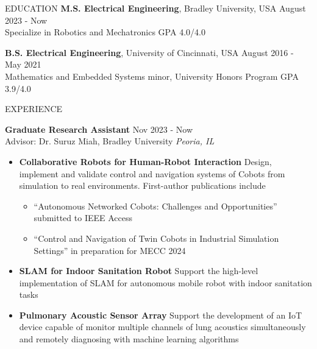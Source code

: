 \documentclass{lib/resume} %
\begin{document}
\begin{rSection}{EDUCATION}
    {\bf M.S. Electrical Engineering}, Bradley University, USA \hfill {August 2023 - Now} \\
    Specialize in Robotics and Mechatronics \hfill GPA 4.0/4.0 \smallskip

    {\bf B.S. Electrical Engineering}, University of Cincinnati, USA \hfill {August 2016 - May 2021}\\
    Mathematics and Embedded Systems minor, University Honors Program \hfill {GPA 3.9/4.0}
\end{rSection}

\begin{rSection}{EXPERIENCE}

    \textbf{Graduate Research Assistant} \hfill Nov 2023 - Now \\
    Advisor: Dr. Suruz Miah, Bradley University \hfill \textit{Peoria, IL}
    \begin{itemize}
        \itemsep -4pt {}
        \item \textbf{Collaborative Robots for Human-Robot Interaction} Design,
        implement and validate control and navigation systems of Cobots from
        simulation to real environments. First-author publications include
        \begin{itemize}[label=$\circ$]
            \vspace{-3pt}
            \item ``Autonomous Networked Cobots: Challenges and Opportunities'' submitted to IEEE Access
            \vspace{-3pt}
            \item ``Control and Navigation of Twin Cobots in Industrial Simulation Settings'' in preparation for MECC 2024
            \vspace{3pt}
        \end{itemize}
        \item \textbf{SLAM for Indoor Sanitation Robot} Support the high-level implementation of SLAM for autonomous mobile robot with indoor sanitation tasks
        \item \textbf{Pulmonary Acoustic Sensor Array} Support the development of an IoT device capable of monitor multiple channels of lung acoustics simultaneously and remotely diagnosing with machine learning algorithms
    \end{itemize}


\end{rSection}
\end{document}
